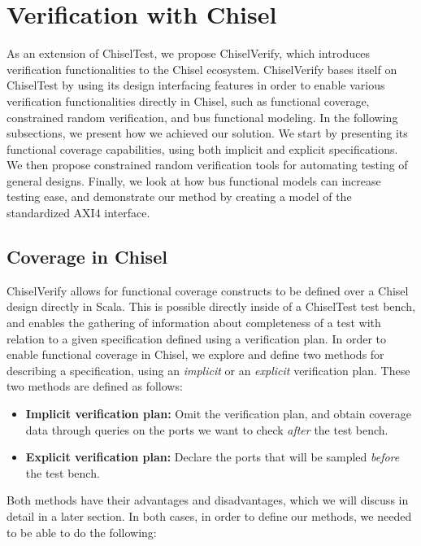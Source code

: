 \documentclass[conference]{IEEEtran}
\begin{document}
\section{Verification with Chisel}
\label{sec:verify}

As an extension of ChiselTest, we propose ChiselVerify, which introduces verification functionalities to the Chisel ecosystem.
ChiselVerify bases itself on ChiselTest by using its design interfacing features in order to enable various verification functionalities directly in Chisel, such as functional coverage, constrained random verification, and bus functional modeling. 
In the following subsections, we present how we achieved our solution.
We start by presenting its functional coverage capabilities,  using both implicit and explicit specifications.
We then propose constrained random verification tools for automating testing of general designs.
Finally, we look at how bus functional models can increase testing ease, and demonstrate our method by creating a model of the standardized AXI4 interface. 


\subsection{Coverage in Chisel}
ChiselVerify allows for functional coverage constructs to be defined over a Chisel design directly in Scala. 
This is possible directly inside of a ChiselTest test bench, and enables the gathering of information about completeness of a test with relation to a given specification defined using a verification plan.
In order to enable functional coverage in Chisel, we explore and define two methods for describing a specification, using an \emph{implicit} or an \emph{explicit} verification plan.
These two methods are defined as follows:

\begin{itemize}
	\item \textbf{Implicit verification plan:} Omit the verification plan, and obtain coverage data through queries on the ports we want to check \emph{after} the test bench.
	\item \textbf{Explicit verification plan:} Declare the ports that will be sampled \emph{before} the test bench.
\end{itemize}

Both methods have their advantages and disadvantages, which we will discuss in detail in a later section.
In both cases, in order to define our methods, we needed to be able to do the following:
\end{document}
